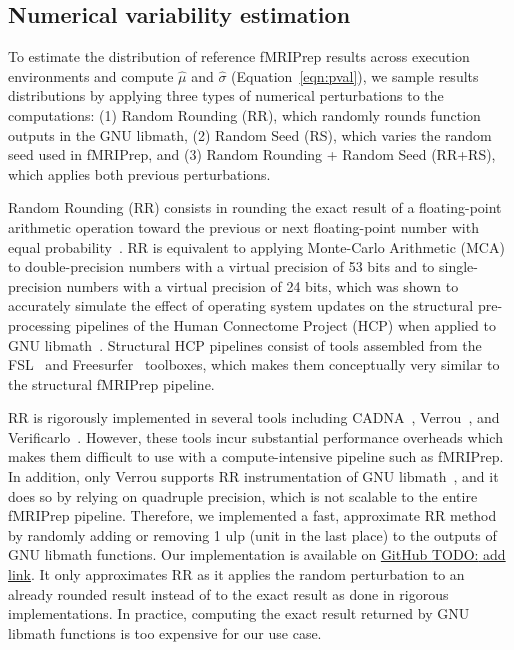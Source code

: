 \documentclass{article}
\newcommand{\TODO}[1]{\color{red}\textsc{TODO:} #1\color{black}\xspace}
\begin{document}
\subsection{Numerical variability estimation}

To estimate the distribution of reference fMRIPrep results across execution
environments and compute $\hat \mu$ and $\hat \sigma$ (Equation~\ref{eqn:pval}), we
sample results distributions by applying three types of numerical perturbations
to the computations: (1) Random Rounding (RR), which randomly rounds function
outputs in the GNU libmath, (2) Random Seed (RS), which varies the random seed
used in fMRIPrep, and (3) Random Rounding + Random Seed (RR+RS), which applies
both previous perturbations.

Random Rounding (RR) consists in rounding the exact result of a floating-point
arithmetic operation toward the previous or next floating-point number with
equal probability~\cite{forsythe1959reprint}. RR is equivalent to applying
Monte-Carlo Arithmetic (MCA) to double-precision numbers with a virtual
precision of 53 bits and to single-precision numbers with a virtual precision of
24 bits, which was shown to accurately simulate the effect of operating system
updates on the structural pre-processing pipelines of the Human Connectome
Project (HCP) when applied to GNU libmath~\cite{salari2021accurate}. Structural
HCP pipelines consist of tools assembled from the FSL~\cite{jenkinson2012fsl}
and Freesurfer~\cite{fischl2012freesurfer} toolboxes, which makes them
conceptually very similar to the structural fMRIPrep pipeline.

RR is rigorously implemented in several tools including
CADNA~\cite{jezequel2008cadna}, Verrou~\cite{fevotte2016verrou}, and
Verificarlo~\cite{denis2016verificarlo}. However, these tools incur substantial
performance overheads which makes them difficult to use with a compute-intensive
pipeline such as fMRIPrep. In addition, only Verrou supports RR instrumentation
of GNU libmath~\cite{fevotte2019debugging}, and it does so by relying on
quadruple precision, which is not scalable to the entire fMRIPrep pipeline.
Therefore, we implemented a fast, approximate RR method by randomly adding or
removing 1 ulp (unit in the last place) to the outputs of GNU libmath functions.
Our implementation is available on \href{...}{GitHub \TODO{add link}}. It only
approximates RR as it applies the random perturbation to an already rounded
result instead of to the exact result as done in rigorous implementations. In
practice, computing the exact result returned by GNU libmath functions is too
expensive for our use case.
\end{document}
